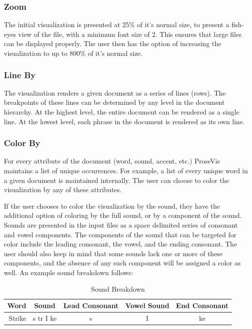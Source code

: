 \documentclass[fleqn]{article}
\begin{document}
\subsubsection*{Zoom}
The initial visualization is presented at 25\% of it's normal size, to present a fish-eyes view of the file, with a minimum font size of 2. This ensures that large files can be displayed properly. The user then has the option of increasing the visualization to up to 800\% of it's normal size.

\subsubsection*{Line By}
The visualization renders a given document as a series of lines (rows).  The breakpoints of these lines can be determined by any level in the document hierarchy.  At the highest level, the entire document can be rendered as a single line.  At the lowest level, each phrase in the document is rendered as its own line.

\subsubsection*{Color By}
For every attribute of the document (word, sound, accent, etc.) ProseVis maintains a list of unique occurrences.  For example, a list of every unique word in a given document is maintained internally.  The user can choose to color the visualization by any of these attributes.  

If the user chooses to color the visualization by the sound, they have the additional option of coloring by the full sound, or by a component of the sound.  Sounds are presented in the input files as a space delimited series of consonant and vowel components.  The components of the sound that can be targeted for color include the leading consonant, the vowel, and the ending consonant.  The user should also keep in mind that some sounds lack one or more of these components, and the absence of any such component will be assigned a color as well.  An example sound breakdown follows:
\\
\begin{table}[h]
\centering
\begin{tabular}{| r | c || c | c | c | }
\hline
Word & Sound & Lead Consonant & Vowel Sound & End Consonant\\
\hline
Strike & s tr I ke & s & I & ke \\
\hline
\end{tabular}
\caption*{Sound Breakdown}
\end{table}
\end{document}
